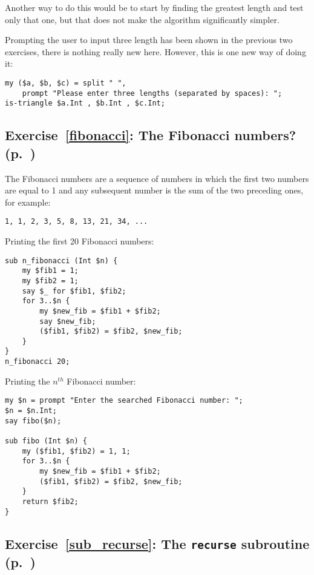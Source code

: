 Another way to do this would be to start by finding the greatest 
length and test only that one, but that does not make the 
algorithm significantly simpler.

Prompting the user to input three length has been shown in 
the previous two exercises, there is nothing really new here.
However, this is one new way of doing it:

\begin{verbatim}
my ($a, $b, $c) = split " ", 
    prompt "Please enter three lengths (separated by spaces): ";
is-triangle $a.Int , $b.Int , $c.Int;
\end{verbatim}


\subsection{Exercise~\ref{fibonacci}: The Fibonacci numbers? (p.~\pageref{fibonacci})}
\label{sol_fibonacci}

The Fibonacci numbers are a sequence of numbers in which the 
first two numbers are equal to 1 and any subsequent number is the 
sum of the two preceding ones, for example:
\begin{verbatim}
1, 1, 2, 3, 5, 8, 13, 21, 34, ...
\end{verbatim}

Printing the first 20 Fibonacci numbers:

\begin{verbatim}
sub n_fibonacci (Int $n) {
    my $fib1 = 1;
    my $fib2 = 1;
    say $_ for $fib1, $fib2;
    for 3..$n {
        my $new_fib = $fib1 + $fib2;
        say $new_fib;
        ($fib1, $fib2) = $fib2, $new_fib;
    }
}
n_fibonacci 20;
\end{verbatim}

Printing the $n^{th}$ Fibonacci number:

\begin{verbatim}
my $n = prompt "Enter the searched Fibonacci number: ";
$n = $n.Int;
say fibo($n);

sub fibo (Int $n) {
    my ($fib1, $fib2) = 1, 1;
    for 3..$n {
        my $new_fib = $fib1 + $fib2;
        ($fib1, $fib2) = $fib2, $new_fib;
    }
    return $fib2;
}    
\end{verbatim}

\subsection{Exercise~\ref{sub_recurse}: The {\tt recurse} subroutine (p.~\pageref{sub_recurse})}
\label{sol_sub_recurse}

